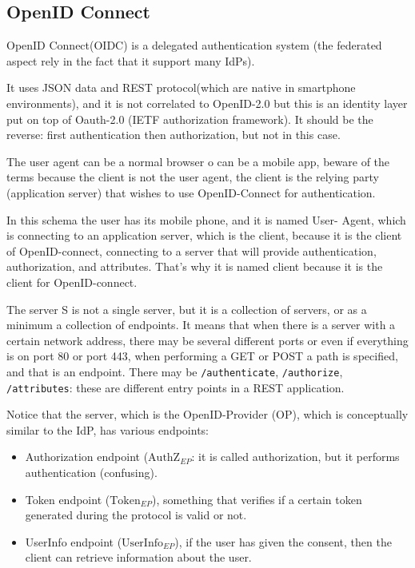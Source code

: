 \subsection{OpenID Connect}
OpenID Connect(OIDC) is a delegated authentication system (the
federated aspect rely in the fact that it support many IdPs).

It uses JSON data and REST protocol(which are native in smartphone
environments), and it is not correlated to OpenID-2.0 but this is an
identity layer put on top of Oauth-2.0 (IETF authorization framework).
It should be the reverse: first authentication then authorization, but
not in this case.

The user agent can be a normal browser o can be a mobile app, beware
of the terms because the client is not the user agent, the client is
the relying party (application server) that wishes to use
OpenID-Connect for authentication.

In this schema the user has its mobile phone, and it is named User-
Agent, which is connecting to an application server, which is the
client, because it is the client of OpenID-connect, connecting to a
server that will provide authentication, authorization, and
attributes. That’s why it is named client because it is the client for
OpenID-connect.

The server S is not a single server, but it is a collection of
servers, or as a minimum a collection of endpoints. It means that when
there is a server with a certain network address, there may be several
different ports or even if everything is on port 80 or port 443, when
performing a GET or POST a path is specified, and that is an endpoint.
There may be \texttt{/authenticate}, \texttt{/authorize},
\texttt{/attributes}: these are different entry points in a REST
application.

Notice that the server, which is the OpenID-Provider (OP), which is
conceptually similar to the IdP, has various endpoints:
\begin{itemize}
  \item Authorization endpoint ($\text{AuthZ}_{EP}$: it is called
    authorization, but it performs authentication (confusing).
  \item Token endpoint ($\text{Token}_{EP}$), something that verifies
    if a certain token generated during the protocol is valid or not.
  \item UserInfo endpoint ($\text{UserInfo}_{EP}$), if the user has
    given the consent, then the client can retrieve information about
    the user.
\end{itemize}

